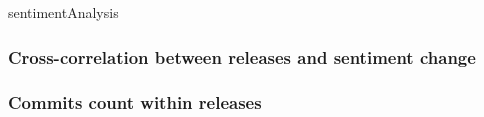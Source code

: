 sentimentAnalysis

\subsubsection{Cross-correlation between releases and sentiment change}


\subsubsection{Commits count within releases}

